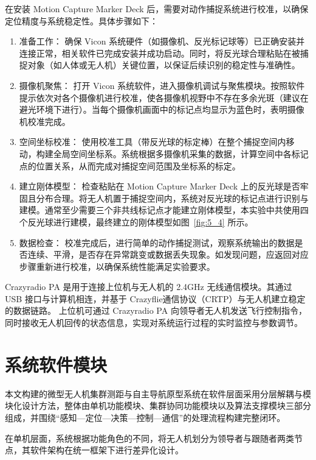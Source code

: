 在安装 Motion Capture Marker Deck 后，需要对动作捕捉系统进行校准，以确保定位精度与系统稳定性。具体步骤如下：

\begin{enumerate}
    \item 准备工作：  
    确保 Vicon 系统硬件（如摄像机、反光标记球等）已正确安装并连接正常，相关软件已完成安装并成功启动。同时，将反光球合理粘贴在被捕捉对象（如人体或无人机）关键位置，以保证后续识别的稳定性与准确性。

    \item 摄像机聚焦：  
    打开 Vicon 系统软件，进入摄像机调试与聚焦模块。按照软件提示依次对各个摄像机进行校准，使各摄像机视野中不存在多余光斑（建议在避光环境下进行）。当每个摄像机画面中的标记点均显示为蓝色时，表明摄像机校准完成。

    \item 空间坐标校准：  
    使用校准工具（带反光球的标定棒）在整个捕捉空间内移动，构建全局空间坐标系。系统根据多摄像机采集的数据，计算空间中各标记点的位置关系，从而完成对捕捉空间范围及坐标系的标定。

    \item 建立刚体模型：  
    检查粘贴在 Motion Capture Marker Deck 上的反光球是否牢固且分布合理。将无人机置于捕捉空间内，系统对反光球的标记点进行识别与建模。通常至少需要三个非共线标记点才能建立刚体模型，本实验中共使用四个反光球进行建模，最终建立的刚体模型如图~\ref{fig:5_4} 所示。

    \item 数据检查：  
    校准完成后，进行简单的动作捕捉测试，观察系统输出的数据是否连续、平滑，是否存在异常跳变或数据丢失现象。如发现问题，应返回对应步骤重新进行校准，以确保系统性能满足实验要求。
\end{enumerate}

Crazyradio PA 是用于连接上位机与无人机的 2.4GHz 无线通信模块。其通过 USB 接口与计算机相连，并基于 Crazyflie通信协议（CRTP）与无人机建立稳定的数据链路。
上位机可通过 Crazyradio PA 向领导者无人机发送飞行控制指令，同时接收无人机回传的状态信息，实现对系统运行过程的实时监控与参数调节。

\section{系统软件模块}
本文构建的微型无人机集群测距与自主导航原型系统在软件层面采用分层解耦与模块化设计方法，整体由单机功能模块、集群协同功能模块以及算法支撑模块三部分组成，并围绕“感知—定位—决策—控制—通信”的处理流程构建完整闭环。

在单机层面，系统根据功能角色的不同，将无人机划分为领导者与跟随者两类节点，其软件架构在统一框架下进行差异化设计。

